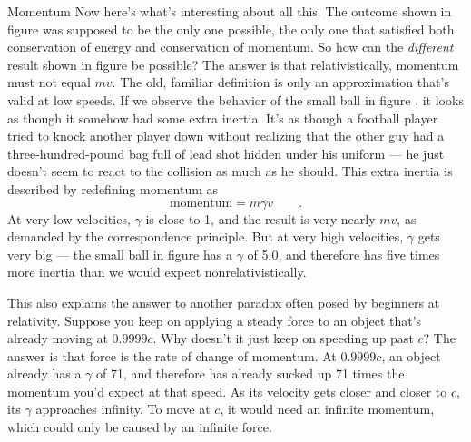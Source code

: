 \begin{envsubsection}{Momentum}
Now here's what's interesting about all this. The outcome shown in figure 
was supposed to be the only one possible, the only one that satisfied both conservation of energy
and conservation of momentum. So how can the \emph{different} result shown in figure
 be possible? The answer is that relativistically, momentum must not equal
$mv$. The old, familiar definition is only an approximation that's valid at low speeds. If
we observe the behavior of the small ball in figure , it looks as though it
somehow had some extra inertia. It's as though a football player tried to knock another player
down without realizing that the other guy had a three-hundred-pound bag full of lead shot
hidden under his uniform --- he just doesn't seem to react to the collision as much as he should.
This extra inertia is described by redefining momentum as
\begin{equation*}
	\text{momentum} = m\gamma v \qquad .
\end{equation*}
At very low velocities, $\gamma$ is close to 1, and the result is very nearly $mv$, as demanded
by the correspondence principle. But at very high velocities, $\gamma$ gets very big --- the
small ball in figure  has a $\gamma$ of 5.0, and therefore has five times
more inertia than we would expect nonrelativistically.

This also explains the answer to another paradox often posed by beginners at relativity.
Suppose you keep on applying a steady force to an object that's already moving at $0.9999c$.
Why doesn't it just keep on speeding up past $c$? The answer is that force is the rate of
change of momentum. At $0.9999c$, an object already has a $\gamma$ of 71, and therefore
has already sucked up 71 times the momentum you'd expect at that speed. As its velocity gets closer and
closer to $c$, its $\gamma$ approaches infinity. To move at $c$, it would need an infinite
momentum, which could only be caused by an infinite force.
\end{envsubsection}
%
